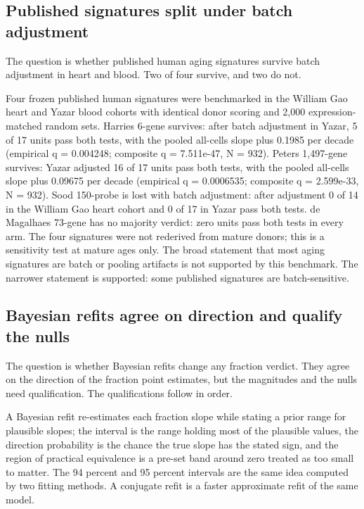 \documentclass[11pt]{article}
\begin{document}
\subsection*{Published signatures split under batch adjustment}

The question is whether published human aging signatures survive batch adjustment in heart and blood. Two of four survive, and two do not.

Four frozen published human signatures were benchmarked in the William Gao heart and Yazar blood cohorts with identical donor scoring and 2,000 expression-matched random sets. Harries 6-gene survives: after batch adjustment in Yazar, 5 of 17 units pass both tests, with the pooled all-cells slope plus 0.1985 per decade (empirical q = 0.004248; composite q = 7.511e-47, N = 932). Peters 1,497-gene survives: Yazar adjusted 16 of 17 units pass both tests, with the pooled all-cells slope plus 0.09675 per decade (empirical q = 0.0006535; composite q = 2.599e-33, N = 932). Sood 150-probe is lost with batch adjustment: after adjustment 0 of 14 in the William Gao heart cohort and 0 of 17 in Yazar pass both tests. de Magalhaes 73-gene has no majority verdict: zero units pass both tests in every arm. The four signatures were not rederived from mature donors; this is a sensitivity test at mature ages only. The broad statement that most aging signatures are batch or pooling artifacts is not supported by this benchmark. The narrower statement is supported: some published signatures are batch-sensitive.


\subsection*{Bayesian refits agree on direction and qualify the nulls}

The question is whether Bayesian refits change any fraction verdict. They agree on the direction of the fraction point estimates, but the magnitudes and the nulls need qualification. The qualifications follow in order.

A Bayesian refit re-estimates each fraction slope while stating a prior range for plausible slopes; the interval is the range holding most of the plausible values, the direction probability is the chance the true slope has the stated sign, and the region of practical equivalence is a pre-set band around zero treated as too small to matter. The 94 percent and 95 percent intervals are the same idea computed by two fitting methods. A conjugate refit is a faster approximate refit of the same model.
\end{document}
